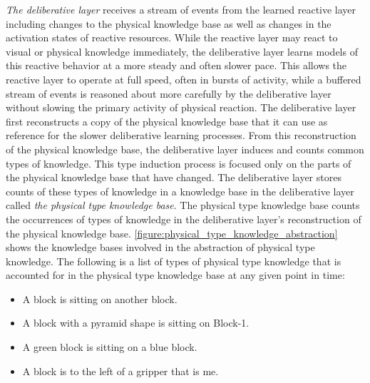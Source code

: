 \emph{The deliberative layer} receives a stream of events from the
learned reactive layer including changes to the physical knowledge
base as well as changes in the activation states of reactive
resources.  While the reactive layer may react to visual or physical
knowledge immediately, the deliberative layer learns models of this
reactive behavior at a more steady and often slower pace.  This allows
the reactive layer to operate at full speed, often in bursts of
activity, while a buffered stream of events is reasoned about more
carefully by the deliberative layer without slowing the primary
activity of physical reaction.  The deliberative layer first
reconstructs a copy of the physical knowledge base that it can use as
reference for the slower deliberative learning processes.  From this
reconstruction of the physical knowledge base, the deliberative layer
induces and counts common types of knowledge.  This type induction
process is focused only on the parts of the physical knowledge base
that have changed.  The deliberative layer stores counts of these
types of knowledge in a knowledge base in the deliberative layer
called \emph{the physical type knowledge base}.  The physical type
knowledge base counts the occurrences of types of knowledge in the
deliberative layer's reconstruction of the physical knowledge base.
{\mbox{\autoref{figure:physical_type_knowledge_abstraction}}} shows
the knowledge bases involved in the abstraction of physical type
knowledge.  The following is a list of types of physical type
knowledge that is accounted for in the physical type knowledge base at
any given point in time:
\begin{itemize}
\item A block is sitting on another block.
\item A block with a pyramid shape is sitting on Block-1.
\item A green block is sitting on a blue block.
\item A block is to the left of a gripper that is me.
\end{itemize}
